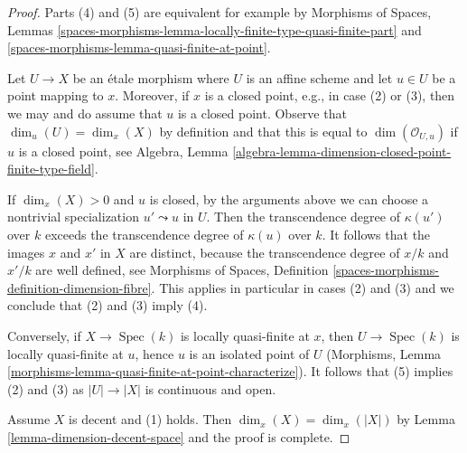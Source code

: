 \documentclass{stacks-project}
\theoremstyle{plain}
\theoremstyle{definition}
\theoremstyle{remark}
\numberwithin{equation}{subsection}
\def\Spec{\mathop{\mathrm{Spec}}}
\begin{document}
\begin{proof}
Parts (4) and (5) are equivalent for example by
Morphisms of Spaces, Lemmas
\ref{spaces-morphisms-lemma-locally-finite-type-quasi-finite-part} and
\ref{spaces-morphisms-lemma-quasi-finite-at-point}.

\medskip\noindent
Let $U \to X$ be an \'etale morphism where $U$ is an affine scheme and let
$u \in U$ be a point mapping to $x$. Moreover, if $x$ is a closed
point, e.g., in case (2) or (3), then we may and do assume that $u$
is a closed point. Observe that $\dim_u(U) = \dim_x(X)$ by definition
and that this is equal to $\dim(\mathcal{O}_{U, u})$ if $u$ is a closed
point, see Algebra, Lemma
\ref{algebra-lemma-dimension-closed-point-finite-type-field}.

\medskip\noindent
If $\dim_x(X) > 0$ and $u$ is closed, by the arguments above
we can choose a nontrivial
specialization $u' \leadsto u$ in $U$. Then the transcendence degree
of $\kappa(u')$ over $k$ exceeds the transcendence degree of
$\kappa(u)$ over $k$. It follows that the images $x$ and $x'$ in $X$
are distinct, because the transcendence degree of $x/k$ and $x'/k$
are well defined, see Morphisms of Spaces, Definition
\ref{spaces-morphisms-definition-dimension-fibre}.
This applies in particular in cases (2) and (3) and we
conclude that (2) and (3) imply (4).

\medskip\noindent
Conversely, if $X \to \Spec(k)$ is locally quasi-finite at $x$, then
$U \to \Spec(k)$ is locally quasi-finite at $u$, hence $u$ is an
isolated point of $U$
(Morphisms, Lemma \ref{morphisms-lemma-quasi-finite-at-point-characterize}).
It follows that (5) implies (2) and (3) as
$|U| \to |X|$ is continuous and open.

\medskip\noindent
Assume $X$ is decent and (1) holds. Then $\dim_x(X) = \dim_x(|X|)$
by Lemma \ref{lemma-dimension-decent-space} and the proof is complete.
\end{proof}
\end{document}
